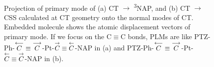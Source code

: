 \begin{figure}[]
\\
\caption{
Projection of primary mode of (a) CT $\rightarrow$ \textsuperscript{3}NAP, and (b) CT $\rightarrow$ CSS calculated at CT geometry onto the normal modes of CT. Embedded molecule shows the atomic displacement vectors of primary mode. If we focus on the C$\equiv$C bonds, PLMs are like
PTZ-Ph-$\protect\overset{\longleftarrow}{C}\equiv\protect\overset{\longrightarrow}{C}$-Pt-$\protect\overset{\rightarrow}{C}\equiv\protect\overset{\leftarrow}{C}$-NAP
in (a) and
PTZ-Ph-$\protect\overset{\longleftarrow}{C}\equiv\protect\overset{\longrightarrow}{C}$-Pt-$\protect\overset{\leftarrow}{C}\equiv\protect\overset{\rightarrow}{C}$-NAP
in (b).
}\label{projT3}
\end{figure}


